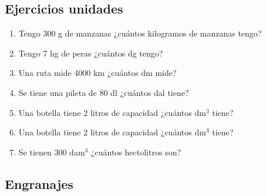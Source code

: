 \newpage
\subsection*{Ejercicios unidades}

\begin{enumerate}
\item Tengo 300 g de manzanas ¿cuántos kilogramos de manzanas tengo?

\item Tengo 7 hg de peras ¿cuántos dg tengo?

\item Una ruta mide 4000 km ¿cuántos dm mide?

\item Se tiene una pileta de 80 dl ¿cuántos dal tiene?

\item Una botella tiene 2 litros de capacidad ¿cuántos dm$^3$ tiene?

\item Una botella tiene 2 litros de capacidad ¿cuántos dm$^3$ tiene?

\item Se tienen 300 dam$^3$ ¿cuántos hectolitros son?
\end{enumerate}


\subsection*{Engranajes}


